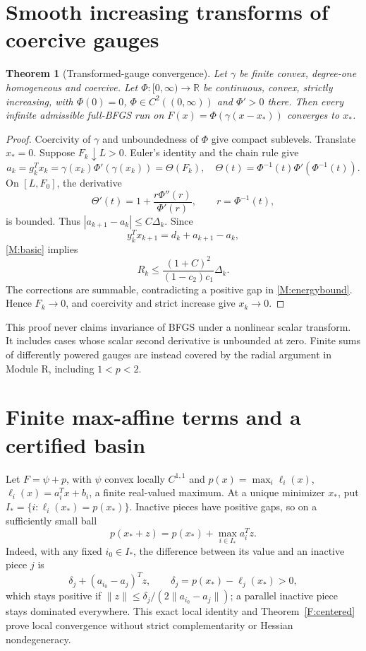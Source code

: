 \documentclass[10pt,oneside,openany]{book}
\newtheorem{theorem}{Theorem}[chapter]
\theoremstyle{remark}\newtheorem{remark}{Remark}[chapter]
\begin{document}
\section{Smooth increasing transforms of coercive gauges}
\begin{theorem}[Transformed-gauge convergence]\label{F:transform}
Let $\gamma$ be finite convex, degree-one homogeneous and coercive. Let $\Phi:[0,\infty)\to\mathbb R$ be continuous, convex, strictly increasing, with $\Phi(0)=0$, $\Phi\in C^2((0,\infty))$ and $\Phi'>0$ there. Then every infinite admissible full-BFGS run on $F(x)=\Phi(\gamma(x-x_*))$ converges to $x_*$.
\end{theorem}
\begin{proof}
Coercivity of $\gamma$ and unboundedness of $\Phi$ give compact sublevels. Translate $x_*=0$. Suppose $F_k\downarrow L>0$. Euler's identity and the chain rule give
\[
 a_k=g_k^Tx_k=\gamma(x_k)\Phi'(\gamma(x_k))=\Theta(F_k),
\quad\Theta(t)=\Phi^{-1}(t)\Phi'(\Phi^{-1}(t)).
\]
On $[L,F_0]$, the derivative
\[
 \Theta'(t)=1+\frac{r\Phi''(r)}{\Phi'(r)},\qquad r=\Phi^{-1}(t),
\]
is bounded. Thus $|a_{k+1}-a_k|\le C\Delta_k$. Since
\[
 y_k^Tx_{k+1}=d_k+a_{k+1}-a_k,
\]
\eqref{M:basic} implies
\[
 R_k\le\frac{(1+C)^2}{(1-c_2)c_1}\Delta_k.
\]
The corrections are summable, contradicting a positive gap in \eqref{M:energybound}. Hence $F_k\to0$, and coercivity and strict increase give $x_k\to0$.
\end{proof}
This proof never claims invariance of BFGS under a nonlinear scalar transform. It includes cases whose scalar second derivative is unbounded at zero. Finite sums of differently powered gauges are instead covered by the radial argument in Module R, including $1<p<2$.

\section{Finite max-affine terms and a certified basin}
Let $F=\psi+p$, with $\psi$ convex locally $C^{1,1}$ and $p(x)=\max_i\ell_i(x)$, $\ell_i(x)=a_i^Tx+b_i$, a finite real-valued maximum. At a unique minimizer $x_*$, put $I_*=\{i:\ell_i(x_*)=p(x_*)\}$. Inactive pieces have positive gaps, so on a sufficiently small ball
\begin{equation}\label{F:active}
 p(x_*+z)=p(x_*)+\max_{i\in I_*}a_i^Tz.
\end{equation}
Indeed, with any fixed $i_0\in I_*$, the difference between its value and an inactive piece $j$ is
\[
 \delta_j+(a_{i_0}-a_j)^Tz,\qquad \delta_j=p(x_*)-\ell_j(x_*)>0,
\]
which stays positive if $\|z\|\le\delta_j/(2\|a_{i_0}-a_j\|)$; a parallel inactive piece stays dominated everywhere. This exact local identity and Theorem~\ref{F:centered} prove local convergence without strict complementarity or Hessian nondegeneracy.
\end{document}
